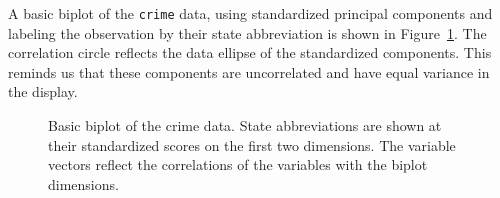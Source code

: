 \documentclass[
  letterpaper,
  10pt,
  krantz2]{krantz}
\makeatletter
\newenvironment{Shaded}{\begin{snugshade}}{\end{snugshade}}
\newcommand{\AttributeTok}[1]{\textcolor[rgb]{0.40,0.45,0.13}{#1}}
\newcommand{\CommentTok}[1]{\textcolor[rgb]{0.37,0.37,0.37}{#1}}
\newcommand{\ConstantTok}[1]{\textcolor[rgb]{0.56,0.35,0.01}{#1}}
\newcommand{\DecValTok}[1]{\textcolor[rgb]{0.68,0.00,0.00}{#1}}
\newcommand{\FunctionTok}[1]{\textcolor[rgb]{0.28,0.35,0.67}{#1}}
\newcommand{\NormalTok}[1]{\textcolor[rgb]{0.00,0.23,0.31}{#1}}
\newcommand{\OtherTok}[1]{\textcolor[rgb]{0.00,0.23,0.31}{#1}}
\newcommand{\SpecialCharTok}[1]{\textcolor[rgb]{0.37,0.37,0.37}{#1}}
\newcommand{\StringTok}[1]{\textcolor[rgb]{0.13,0.47,0.30}{#1}}
\newenvironment{kframe}{%
  \medskip{}
  \setlength{\fboxsep}{.8em}
  \def\at@end@of@kframe{}%
  \ifinner\ifhmode%
  \def\at@end@of@kframe{\end{minipage}}%
  \begin{minipage}{\columnwidth}%
  \fi\fi%
  \def\FrameCommand##1{\hskip\@totalleftmargin \hskip-\fboxsep
  \colorbox{shadecolor}{##1}\hskip-\fboxsep
      \hskip-\linewidth \hskip-\@totalleftmargin \hskip\columnwidth}%
  \MakeFramed {\advance\hsize-\width
    \@totalleftmargin\z@ \linewidth\hsize
    \@setminipage}}%
{\par\unskip\endMakeFramed%
  \at@end@of@kframe}
\renewenvironment{Shaded}{\begin{kframe}}{\end{kframe}}
\makeatother
\begin{document}
A basic biplot of the \texttt{crime} data, using standardized principal
components and labeling the observation by their state abbreviation is
shown in Figure~\ref{fig-crime-biplot1}. The correlation circle reflects
the data ellipse of the standardized components. This reminds us that
these components are uncorrelated and have equal variance in the
display.

\begin{Shaded}
\end{Shaded}

\begin{figure}[H]


\caption{\label{fig-crime-biplot1}Basic biplot of the crime data. State
abbreviations are shown at their standardized scores on the first two
dimensions. The variable vectors reflect the correlations of the
variables with the biplot dimensions.}

\end{figure}%
\end{document}
